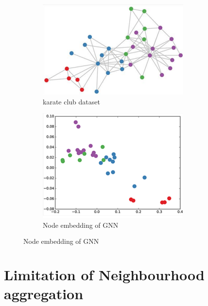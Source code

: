     \begin{figure}[h]
    \centering
    \begin{subfigure}[b]{0.5\textwidth}
                \includegraphics[width=\textwidth]{tex/img/dataset.png}
                \caption{karate club dataset}
        \end{subfigure}%
        \hfill
    \begin{subfigure}[b]{0.5\textwidth}
                \includegraphics[width=\textwidth]{tex/img/GEmbed.png}
                \caption{Node embedding of GNN}
       \end{subfigure}%
    \end{figure}
\newpage
\section{Limitation of Neighbourhood aggregation}
